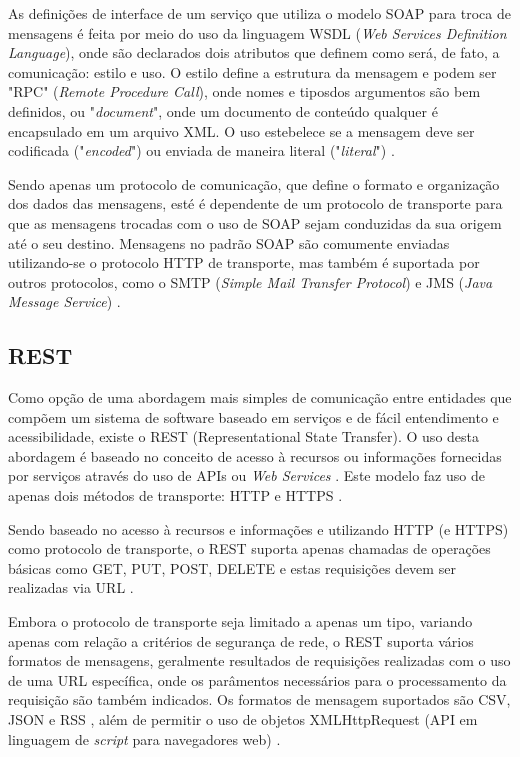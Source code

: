 As definições de interface de um serviço que utiliza o modelo SOAP para troca de mensagens é feita por meio do uso da linguagem WSDL (\textit{Web Services Definition Language}), onde são declarados dois atributos que definem como será, de fato, a comunicação: estilo e uso. O estilo define a estrutura da mensagem e podem ser "RPC" (\textit{Remote Procedure Call}), onde nomes e tiposdos argumentos são bem definidos, ou "\textit{document}", onde um documento de conteúdo qualquer é encapsulado em um arquivo XML. O uso estebelece se a mensagem deve ser codificada ("\textit{encoded}") ou enviada de maneira literal ("\textit{literal}") \cite{Bianco2007}.

Sendo apenas um protocolo de comunicação, que define o formato e organização dos dados das mensagens, esté é dependente de um protocolo de transporte para que as mensagens trocadas com o uso de SOAP sejam conduzidas da sua origem até o seu destino. Mensagens no padrão SOAP são comumente enviadas utilizando-se o protocolo HTTP de transporte, mas também é suportada por outros protocolos, como o SMTP (\textit{Simple Mail Transfer Protocol}) e JMS (\textit{Java Message Service}) \cite{mueller_understanding_2013}.

\subsection{REST}
Como opção de uma abordagem mais simples de comunicação entre entidades que compõem um sistema de software baseado em serviços e de fácil entendimento e acessibilidade, existe o REST (Representational State Transfer). O uso desta abordagem é baseado no conceito de acesso à recursos ou informações fornecidas por serviços através do uso de APIs ou \textit{Web Services} \cite{Bianco2007}. Este modelo faz uso de apenas dois métodos de transporte: HTTP e HTTPS \cite{rozlog_restesoap_2013}.

Sendo baseado no acesso à recursos e informações e utilizando HTTP (e HTTPS) como protocolo de transporte, o REST suporta apenas chamadas de operações básicas como GET, PUT, POST, DELETE e estas requisições devem ser realizadas via URL \cite{rozlog_restesoap_2013}.

Embora o protocolo de transporte seja limitado a apenas um tipo, variando apenas com relação a critérios de segurança de rede, o REST suporta vários formatos de mensagens, geralmente resultados de requisições realizadas com o uso de uma URL específica, onde os parâmentos necessários para o processamento da requisição são também indicados. Os formatos de mensagem suportados são CSV, JSON e RSS \cite{mueller_understanding_2013}, além de permitir o uso de objetos XMLHttpRequest (API em linguagem de \textit{script} para navegadores web) \cite{rozlog_restesoap_2013}.

